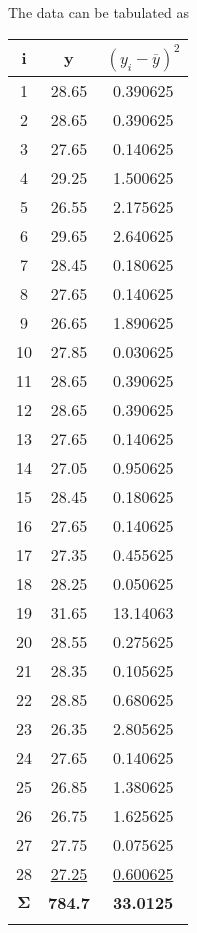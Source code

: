 \documentclass[../main.tex]{subfiles}
\begin{document}
\section{ }
The data can be tabulated as
\bigbreak
	\begin{tabular}{ccc}
		\Xhline{1.5pt} i&y&$(y_{i}-\overline{y})^{2}$\\
		\hline1&28.65&0.390625\\
		2&28.65&0.390625\\
		3&27.65&0.140625\\
		4&29.25&1.500625\\
		5&26.55&2.175625\\
		6&29.65&2.640625\\
		7&28.45&0.180625\\
		8&27.65&0.140625\\
		9&26.65&1.890625\\
		10&27.85&0.030625\\
		11&28.65&0.390625\\
		12&28.65&0.390625\\
		13&27.65&0.140625\\
		14&27.05&0.950625\\
		15&28.45&0.180625\\
		16&27.65&0.140625\\
		17&27.35&0.455625\\
		18&28.25&0.050625\\
		19&31.65&13.14063\\
		20&28.55&0.275625\\
		21&28.35&0.105625\\
		22&28.85&0.680625\\
		23&26.35&2.805625\\
		24&27.65&0.140625\\
		25&26.85&1.380625\\
		26&26.75&1.625625\\
		27&27.75&0.075625\\
		28&\underline{27.25}&\underline{0.600625}\\
		$\bm\Sigma$&\bfseries784.7&\bfseries33.0125\\
		\Xhline{1.5pt}
	\end{tabular}
	\bigbreak
\end{document}
